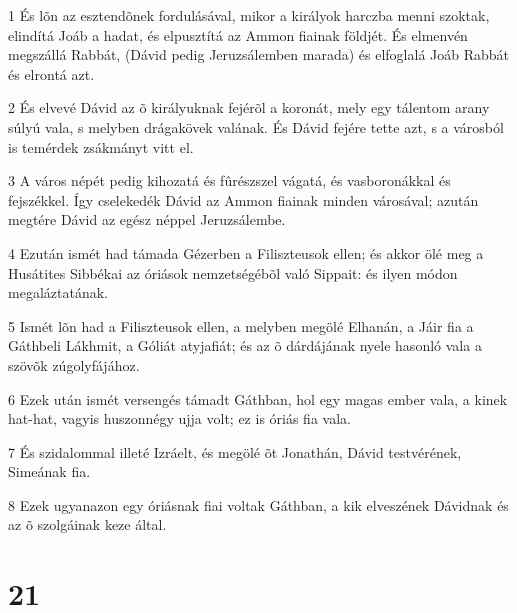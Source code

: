 \par 1 És lõn az esztendõnek fordulásával, mikor a királyok harczba menni szoktak, elindítá Joáb a hadat, és elpusztítá az  Ammon fiainak földjét. És elmenvén megszállá Rabbát, (Dávid pedig Jeruzsálemben marada) és elfoglalá Joáb Rabbát és elrontá azt.
\par 2 És elvevé Dávid az õ királyuknak fejérõl a koronát, mely egy tálentom arany súlyú vala, s melyben drágakövek valának. És Dávid fejére tette azt, s a városból is temérdek zsákmányt vitt el.
\par 3 A város népét pedig kihozatá és fûrészszel vágatá, és vasboronákkal és fejszékkel. Így cselekedék Dávid az Ammon fiainak minden városával; azután megtére Dávid az egész néppel Jeruzsálembe.
\par 4 Ezután ismét had támada Gézerben a Filiszteusok ellen; és akkor ölé meg a Husátites Sibbékai az óriások nemzetségébõl való  Sippait: és ilyen módon megaláztatának.
\par 5 Ismét lõn had a Filiszteusok ellen, a melyben megölé Elhanán, a Jáir fia a Gáthbeli Lákhmit, a Góliát atyjafiát; és az õ dárdájának nyele hasonló vala a szövõk zúgolyfájához.
\par 6 Ezek után ismét versengés támadt Gáthban, hol egy magas ember vala, a kinek hat-hat, vagyis huszonnégy ujja volt; ez is óriás fia vala.
\par 7 És szidalommal illeté Izráelt, és megölé õt Jonathán, Dávid testvérének, Simeának fia.
\par 8 Ezek ugyanazon egy óriásnak fiai voltak Gáthban, a kik elveszének Dávidnak és az õ szolgáinak keze által.

\chapter{21}

